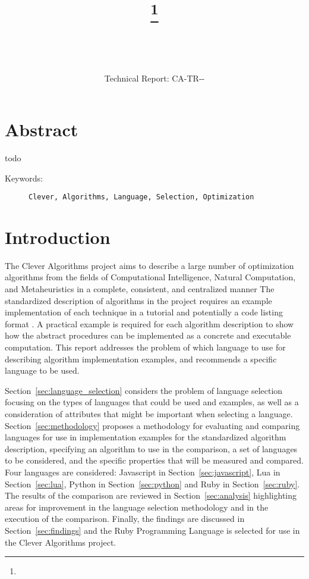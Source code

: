 \documentclass[a4paper, 11pt]{article}
\title{{\myreporttitle}\footnote{\myreportlicense}}
\author{\myreportauthor\\{\myreportemail}\\\small\myreportproject}
\date{\myreportfulldate\\{\small{Technical Report: CA-TR-{\myreportdate}-\myreportversion}}}
\begin{document}
\maketitle

\section*{Abstract} 
todo

\begin{description}
	\item[Keywords:] {\small\texttt{Clever, Algorithms, Language, Selection, Optimization}}
\end{description} 

\section{Introduction}
\label{sec:introduction}
The Clever Algorithms project aims to describe a large number of optimization algorithms from the fields of Computational Intelligence, Natural Computation, and Metaheuristics in a complete, consistent, and centralized manner \cite{Brownlee2010}
The standardized description of algorithms in the project requires an example implementation of each technique in a tutorial and potentially a code listing format \cite{Brownlee2010a}.
A practical example is required for each algorithm description to show how the abstract procedures can be implemented as a concrete and executable computation.
This report addresses the problem of which language to use for describing algorithm implementation examples, and recommends a specific language to be used.

Section~\ref{sec:language_selection} considers the problem of language selection focusing on the types of languages that could be used and examples, as well as a consideration of attributes that might be important when selecting a language.
Section~\ref{sec:methodology} proposes a methodology for evaluating and comparing languages for use in implementation examples for the standardized algorithm description, specifying an algorithm to use in the comparison, a set of languages to be considered, and the specific properties that will be measured and compared.
Four languages are considered: Javascript in Section~\ref{sec:javascript}, Lua in Section~\ref{sec:lua}, Python in Section~\ref{sec:python} and Ruby in Section~\ref{sec:ruby}.
The results of the comparison are reviewed in Section~\ref{sec:analysis} highlighting areas for improvement in the language selection methodology and in the execution of the comparison. 
Finally, the findings are discussed in Section~\ref{sec:findings} and the Ruby Programming Language is selected for use in the Clever Algorithms project.
\end{document}
